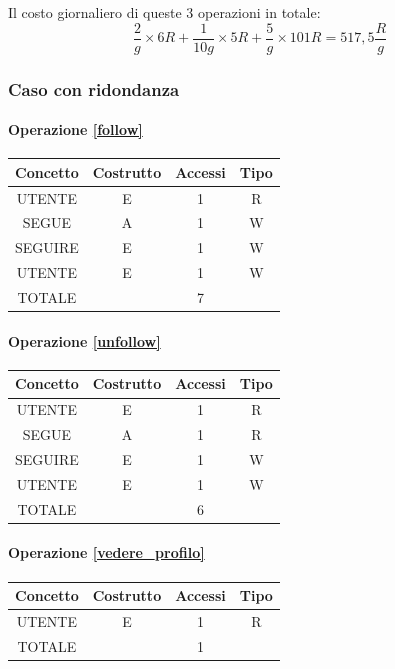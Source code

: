 \documentclass[a4paper,12pt]{report}
\begin{document}
Il costo giornaliero di queste 3 operazioni in totale:
\begin{equation}
  \frac{2} g \times 6 R + \frac{1} {10g} \times 5 R + \frac{5} g \times 101 R = 517,5 \frac{R} g 
\end{equation}

\subsubsection{Caso con ridondanza}
\begin{table}[H]
  \paragraph{Operazione \ref{follow}\newline}
\begin{tabular}{|c|c|c|c|}
\hline
Concetto & Costrutto & Accessi & Tipo \\ \hline
UTENTE   & E         & 1       & R    \\ \hline
SEGUE    & A         & 1       & W    \\ \hline
SEGUIRE  & E         & 1       & W    \\ \hline
UTENTE   & E         & 1       & W    \\ \hline
TOTALE   &           & 7       &      \\ \hline
\end{tabular}
\end{table}
\begin{table}[H]
  \paragraph{Operazione \ref{unfollow}\newline}
\begin{tabular}{|c|c|c|c|}
\hline
Concetto & Costrutto & Accessi & Tipo \\ \hline
UTENTE   & E         & 1       & R    \\ \hline
SEGUE    & A         & 1       & R    \\ \hline
SEGUIRE  & E         & 1       & W    \\ \hline
UTENTE   & E         & 1       & W    \\ \hline
TOTALE   &           & 6       &      \\ \hline
\end{tabular}
\end{table}
\begin{table}[H]
  \paragraph{Operazione \ref{vedere_profilo}\newline}
\begin{tabular}{|c|c|c|c|}
\hline
Concetto & Costrutto & Accessi & Tipo \\ \hline
UTENTE   & E         & 1       & R    \\ \hline
TOTALE   &           & 1       &      \\ \hline
\end{tabular}
\end{table}
\end{document}
